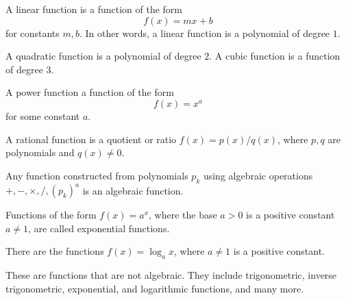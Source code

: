 \documentclass[oneside]{book}
\begin{document}
\begin{definition}
	A linear function is a function of the form
	\begin{equation*}
		f(x)=mx+b
	\end{equation*}
	for constants \(m,b\). In other words, a linear function is a polynomial of degree \(1\).
\end{definition}
\begin{definition}[Quadratic]
	A quadratic function is a polynomial of degree \(2\). A cubic function is a function of degree \(3\).
\end{definition}
\begin{definition}
	A power function a function of the form
	\begin{equation*}
		f(x)=x^a
	\end{equation*}
	for some constant \(a\).
\end{definition}
\begin{definition}
	A rational function is a quotient or ratio \(f(x)=p(x)/q(x)\), where \(p,q\) are polynomials and \(q(x)\neq 0\).
\end{definition}
\begin{definition}
	Any function constructed from polynomials \(p_k\) using algebraic operations \(+,-,\times,/,(p_k)^a\) is an algebraic function.
\end{definition}
\begin{definition}
	Functions of the form \(f(x)=a^x\), where the base \(a>0\) is a positive constant \(a\neq 1\), are called exponential functions.
\end{definition}
\begin{definition}
	There are the functions \(f(x)=\log_a x\), where \(a\neq 1\) is a positive constant.
\end{definition}
\begin{definition}
	These are functions that are not algebraic. They include trigonometric, inverse trigonometric, exponential, and logarithmic functions, and many more.
\end{definition}
\end{document}
